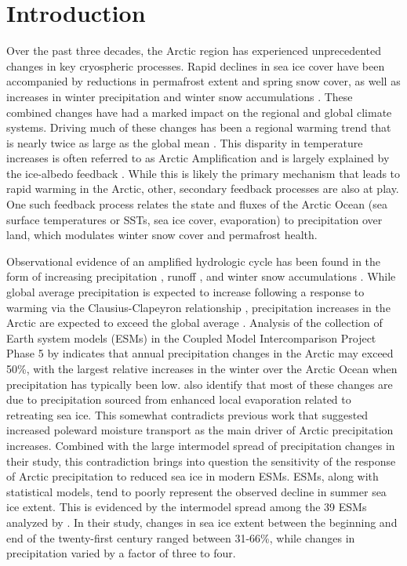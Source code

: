 \section{Introduction}
\label{sec:intro_ch5}

Over the past three decades, the Arctic region has experienced unprecedented changes in key cryospheric processes.
Rapid declines in sea ice cover have been accompanied by reductions in permafrost extent and spring snow cover, as well as increases in winter precipitation and winter snow accumulations \citep{Kohler_2006,Callaghan_2011,Bulygina_2009}. %
These combined changes have had a marked impact on the regional and global climate systems.
Driving much of these changes has been a regional warming trend that is nearly twice as large as the global mean \citep{Serreze_2006c,Screen_2010}.
This disparity in temperature increases is often referred to as Arctic Amplification and is largely explained by the ice-albedo feedback \citep{Curry_1995}.
While this is likely the primary mechanism that leads to rapid warming in the Arctic, other, secondary feedback processes are also at play.
One such feedback process relates the state and fluxes of the Arctic Ocean (sea surface temperatures or SSTs, sea ice cover, evaporation) to precipitation over land, which modulates winter snow cover and permafrost health.

Observational evidence of an amplified hydrologic cycle \citep{Stocker_2005} has been found in the form of increasing precipitation \citep{Rawlins_2006}, runoff \citep{Peterson_2002}, and winter snow accumulations \citep{Kohler_2006,Bulygina_2009}.
While global average precipitation is expected to increase following a response to warming via the Clausius-Clapeyron relationship \citep[e.g.][]{Held_2006,Stephens_2008,Byrne_2015}, precipitation increases in the Arctic are expected to exceed the global average \citep{Stocker_2005}.
Analysis of the collection of Earth system models (ESMs) in the Coupled Model Intercomparison Project Phase 5 \citep[CMIP5; ][]{Taylor_2012} by \citet{Bintanja_2014} indicates that annual precipitation changes in the Arctic may exceed 50\%, with the largest relative increases in the winter over the Arctic Ocean when precipitation has typically been low.
\citet{Bintanja_2014} also identify that most of these changes are due to precipitation sourced from enhanced local evaporation related to retreating sea ice.
This somewhat contradicts previous work that suggested increased poleward moisture transport as the main driver of Arctic precipitation increases. %
Combined with the large intermodel spread of precipitation changes in their study, this contradiction brings into question the sensitivity of the response of Arctic precipitation to reduced sea ice in modern ESMs.
ESMs, along with statistical models, tend to poorly represent the observed decline in summer sea ice extent.
This is evidenced by the intermodel spread among the 39 ESMs analyzed by \citet{Bintanja_2014}.
In their study, changes in sea ice extent between the beginning and end of the twenty-first century ranged between 31-66\%, while changes in precipitation varied by a factor of three to four.

